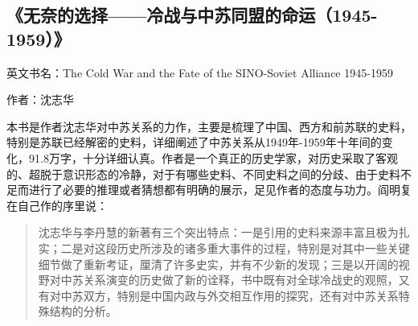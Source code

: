 \subsection{《无奈的选择——冷战与中苏同盟的命运（1945-1959）》}

英文书名：The Cold War and the Fate of the SINO-Soviet Alliance 1945-1959

作者：沈志华

本书是作者沈志华对中苏关系的力作，主要是梳理了中国、西方和前苏联的史料，特别是苏联已经解密的史料，详细阐述了中苏关系从1949年-1959年十年间的变化，91.8万字，十分详细认真。作者是一个真正的历史学家，对历史采取了客观的、超脱于意识形态的冷静，对于有哪些史料、不同史料之间的分歧、由于史料不足而进行了必要的推理或者猜想都有明确的展示，足见作者的态度与功力。阎明复在自己作的序里说：
\begin{quotation}
沈志华与李丹慧的新著有三个突出特点：一是引用的史料来源丰富且极为扎实；二是对这段历史所涉及的诸多重大事件的过程，特别是对其中一些关键细节做了重新考证，厘清了许多史实，并有不少新的发现；三是以开阔的视野对中苏关系演变的历史做了新的诠释，书中既有对全球冷战史的观照，又有对中苏双方，特别是中国内政与外交相互作用的探究，还有对中苏关系特殊结构的分析。
\end{quotation}

